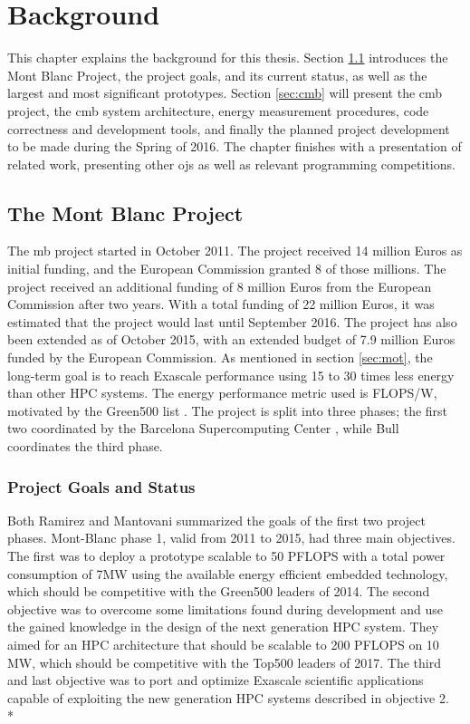 \chapter{Background}
\label{ch:background}
This chapter explains the background for this thesis. Section \ref{sec:mbp} introduces the Mont Blanc Project, the project goals, and its current status, as well as the largest and most significant prototypes. Section \ref{sec:cmb} will present the \gls{cmb} project, the \gls{cmb} system architecture, energy measurement procedures, code correctness and development tools, and finally the planned project development to be made during the Spring of 2016. The chapter finishes with a presentation of related work, presenting other \gls{ojs} as well as relevant programming competitions.

\section{The Mont Blanc Project}
\label{sec:mbp}
The \gls{mb} project \cite{MB} started in October 2011. The project received 14 million Euros as initial funding, and the European Commission granted 8 of those millions. The project received an additional funding of 8 million Euros from the European Commission after two years. With a total funding of 22 million Euros, it was estimated that the project would last until September 2016. The project has also been extended as of October 2015, with an extended budget of 7.9 million Euros funded by the European Commission. As mentioned in section \ref{sec:mot}, the long-term goal is to reach Exascale performance using 15 to 30 times less energy than other HPC systems. The energy performance metric used is FLOPS/W, motivated by the Green500 list \cite{GREEN500}. The project is split into three phases; the first two coordinated by the Barcelona Supercomputing Center \cite{BSC}, while Bull \cite{BULL} coordinates the third phase.

\subsection{Project Goals and Status}
Both Ramirez \cite{p:MB-PRACE-14} and Mantovani \cite{p:MB-15} summarized the goals of the first two project phases. Mont-Blanc phase 1, valid from 2011 to 2015, had three main objectives. The first was to deploy a prototype scalable to 50 PFLOPS with a total power consumption of 7MW using the available energy efficient embedded technology, which should be competitive with the Green500 leaders of 2014. The second objective was to overcome some limitations found during development and use the gained knowledge in the design of the next generation HPC system. They aimed for an HPC architecture that should be scalable to 200 PFLOPS on 10 MW, which should be competitive with the Top500 leaders of 2017. The third and last objective was to port and optimize Exascale scientific applications capable of exploiting the new generation HPC systems described in objective 2. \\*

